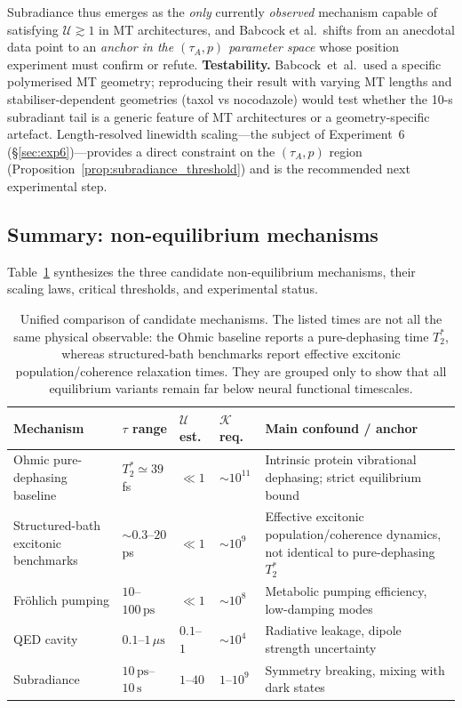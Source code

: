 \documentclass[twocolumn,10pt]{article}
\begin{document}
Subradiance thus emerges as the \emph{only} currently \emph{observed}
mechanism capable of satisfying $\mathcal{U}\gtrsim 1$ in MT architectures,
and Babcock et al.\ shifts from an anecdotal data point to an
\emph{anchor in the $(\tau_A, p)$ parameter space} whose position
experiment must confirm or refute.
\textbf{Testability.} Babcock~et~al.\ used a specific polymerised MT
geometry; reproducing their result with varying MT lengths and
stabiliser-dependent geometries (taxol vs nocodazole) would test whether
the 10-s subradiant tail is a generic feature of MT architectures or a
geometry-specific artefact. Length-resolved linewidth scaling---the subject
of Experiment~6 (\S\ref{sec:exp6})---provides a direct constraint on
the $(\tau_A, p)$ region (Proposition~\ref{prop:subradiance_threshold})
and is the recommended next experimental step.

\subsection{Summary: non-equilibrium mechanisms}
\label{sec:mech_summary}
Table~\ref{tab:mech_comparison} synthesizes the three candidate non-equilibrium mechanisms, their scaling laws, critical thresholds, and experimental status.

\begin{table}[t]
\centering
\caption{Unified comparison of candidate mechanisms. The listed times are not
all the same physical observable: the Ohmic baseline reports a pure-dephasing
time $T_2^*$, whereas structured-bath benchmarks report effective excitonic
population/coherence relaxation times. They are grouped only to show that all
equilibrium variants remain far below neural functional timescales.}
\label{tab:mech_comparison}
\footnotesize
\begin{tabular}{p{2.5cm} p{2.5cm} p{1.2cm} p{1.2cm} p{5.5cm}}
\toprule
Mechanism & $\tau$ range & $\mathcal{U}$ est. & $\mathcal{K}$ req. & Main confound / anchor \\
\midrule
Ohmic pure-dephasing baseline & $T_2^*\simeq39$ fs & $\ll1$ & $\sim 10^{11}$ & Intrinsic protein vibrational dephasing; strict equilibrium bound \\
Structured-bath excitonic benchmarks & $\sim0.3$--$20$ ps & $\ll1$ & $\sim 10^9$ & Effective excitonic population/coherence dynamics, not identical to pure-dephasing $T_2^*$ \\
Fr\"ohlich pumping & $10$--$100\,\mathrm{ps}$ & $\ll 1$ & $\sim 10^8$ & Metabolic pumping efficiency, low-damping modes \\
QED cavity & $0.1$--$1\,\mu\mathrm{s}$ & $0.1$--$1$ & $\sim 10^4$ & Radiative leakage, dipole strength uncertainty \\
Subradiance & $10\,\mathrm{ps}$--$10\,\mathrm{s}$ & $1$--$40$ & $1$--$10^9$ & Symmetry breaking, mixing with dark states \\
\bottomrule
\end{tabular}
\end{table}
\end{document}
